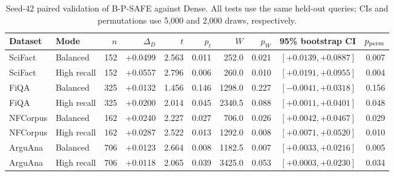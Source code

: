 \begin{table}[t]
\centering
\caption{Seed-42 paired validation of B-P-SAFE against Dense. All tests use the same held-out queries; CIs and permutations use 5,000 and 2,000 draws, respectively.}
\label{tab:paired_stats}
\scriptsize
\setlength{\tabcolsep}{3.0pt}
\begin{tabular}{llrrrrrrrr}
\toprule
Dataset & Mode & $n$ & $\Delta_D$ & $t$ & $p_t$ & $W$ & $p_W$ & 95\% bootstrap CI & $p_{\rm perm}$ \\
\midrule
SciFact & Balanced & 152 & +0.0499 & 2.563 & 0.011 & 252.0 & 0.021 & $[+0.0139,+0.0887]$ & 0.007 \\
SciFact & High recall & 152 & +0.0557 & 2.796 & 0.006 & 260.0 & 0.010 & $[+0.0191,+0.0955]$ & 0.004 \\
\addlinespace[1pt]
FiQA & Balanced & 325 & +0.0132 & 1.456 & 0.146 & 1298.0 & 0.227 & $[-0.0041,+0.0318]$ & 0.156 \\
FiQA & High recall & 325 & +0.0200 & 2.014 & 0.045 & 2340.5 & 0.088 & $[+0.0011,+0.0401]$ & 0.048 \\
\addlinespace[1pt]
NFCorpus & Balanced & 162 & +0.0240 & 2.227 & 0.027 & 706.0 & 0.026 & $[+0.0042,+0.0467]$ & 0.029 \\
NFCorpus & High recall & 162 & +0.0287 & 2.522 & 0.013 & 1292.0 & 0.008 & $[+0.0071,+0.0520]$ & 0.010 \\
\addlinespace[1pt]
ArguAna & Balanced & 706 & +0.0123 & 2.664 & 0.008 & 1182.5 & 0.007 & $[+0.0033,+0.0216]$ & 0.005 \\
ArguAna & High recall & 706 & +0.0118 & 2.065 & 0.039 & 3425.0 & 0.053 & $[+0.0003,+0.0230]$ & 0.034 \\
\bottomrule
\end{tabular}
\end{table}
